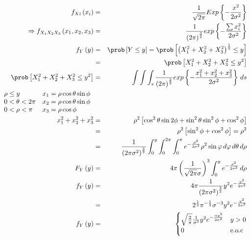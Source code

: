\begin{enumerate}
\begin{enumerate}
\begin{eqnarray*}
f_{Xi} \left(x_{i} \right) &=& \frac{1}{\sqrt{2\pi}} Exp \left\{ - \frac{x^2}{2\sigma^2} \right\}\\
\Rightarrow f_{X_{1}X_{2}X_{3} } \left(x_{1}, x_{2}, x_{3} \right) &=& \frac{1}{\left(2\pi \right)^{ \frac{3}{2} } } exp \left\{- \frac{\sum x_{i}^2}{2\sigma^2} \right\}\\
f_{Y} \left(y \right)&=& \prob \left[Y \leq y \right]= \prob \left[\left( X_{1}^2 + X_{2}^2+ X_{3}^2 \right)^{ \frac{1}{2}} \leq y  \right]\\
&=& \prob \left[ X_{1}^2 + X_{2}^2+ X_{3}^2 \leq y^2  \right]\\
\prob \left[ X_{1}^2 + X_{2}^2+ X_{3}^2 \leq y^2 \right] &=& \int \int \int_{s} \frac{1}{\left( 2\pi \right)^{ \frac{3}{2}}} exp \left\{ - \frac{ x_{1}^2 + x_{2}^2+ x_{3}^2}{2\sigma^2} \right\}\, ds\\
\begin{array}{ll}
\rho \leq y & x_{1}= \rho \cos \theta \sin \phi\\
0 < \theta < 2\pi & x_{2}= \rho \cos \theta \sin \phi\\
0< \rho < \pi & x_{3} = \rho \cos \phi
\end{array}\\
x_{1}^2 + x_{2}^2+ x_{3}^2 &=& \rho^2 \left[ \cos^{2} \theta \sin{2} \phi + \sin^{2}\theta \sin^2 \phi + \cos^2 \phi \right]\\
&=& \rho^2 \left[ \sin ^{2} \phi + \cos^{2} \phi \right]= \rho^2\\
&=& \frac{1}{ \left(2\pi\sigma^2 \right)^{ \frac{3}{2} } } \int_{0}^{y} \int_{0}^{2\pi} \int_{0}^{ \pi} e^{- \frac{\rho^2}{2\sigma^2} } \rho^2 \sin \varphi \,  d\varphi\, d\theta \, d\rho \\
F_{Y} \left(y \right) &=& 4\pi \left( \frac{1}{\sqrt{2\pi} \sigma} \right)^3 \int _{0}^{y} e^{- \frac{\rho^2}{2\sigma^2} }  \, d \rho\\
f_{Y} \left(y \right) &=& 4\pi \frac{1}{\left(2\pi \sigma^2 \right)^{ \frac{3}{2} } } y^2 e^{- \frac{y^2}{ 2\sigma^2} }\\
&=& 2^{\frac{1}{2} } \pi^{-\frac{1}{2}} \sigma^{-3} y^{2}e^{- \frac{y^2}{ 2\sigma^2}}\\
f_{Y} \left( y\right) &=& \begin{cases}
\sqrt{ \frac{2}{\pi} } \frac{1}{\sigma^3} y^2 e^{- \frac{\alpha y^2}{ 2\sigma^2} } & y>0\\
0 & \textrm{e.o.c}
 \end{cases}\\

\end{eqnarray*}
\end{enumerate}
\end{enumerate}
